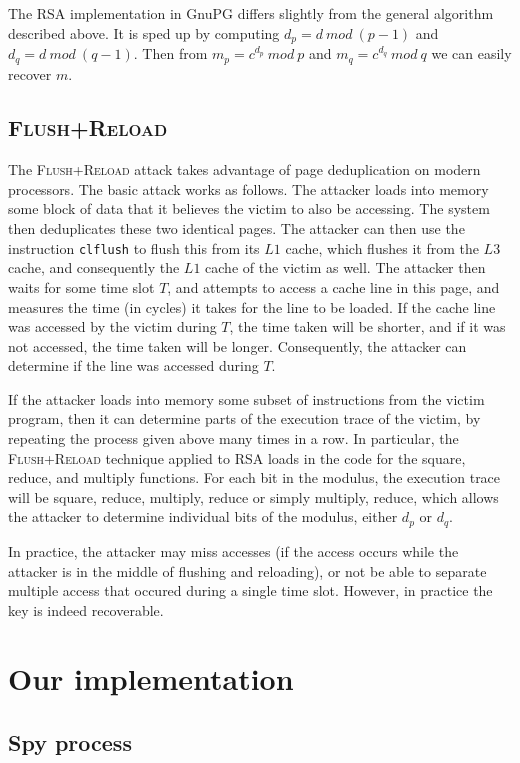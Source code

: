 \documentclass[11pt]{llncs}
\newcommand{\flushreload}{\textsc{Flush}+\textsc{Reload}}
\begin{document}
The RSA implementation in GnuPG differs slightly from the general algorithm
described above. It is sped up by computing $d_p = d\ mod\ (p-1)$ and $d_q = d\
mod\ (q-1)$. Then from $m_p = c^{d_p}\ mod\ p$ and $m_q = c^{d_q}\ mod\ q$ we
can easily recover $m$.

\subsection{\flushreload{}}

The \flushreload{} attack takes advantage of page deduplication on modern
processors. The basic attack works as follows. The attacker loads into memory
some block of data that it believes the victim to also be accessing. The system
then deduplicates these two identical pages. The attacker can then use the
instruction \texttt{clflush} to flush this from its $L1$ cache, which flushes it
from the $L3$ cache, and consequently the $L1$ cache of the victim as well. The
attacker then waits for some time slot $T$, and attempts to access a cache line
in this page, and measures the time (in cycles) it takes for the line to be
loaded. If the cache line was accessed by the victim during $T$, the time taken
will be shorter, and if it was not accessed, the time taken will be longer.
Consequently, the attacker can determine if the line was accessed during $T$.

If the attacker loads into memory some subset of instructions from the victim
program, then it can determine parts of the execution trace of the victim, by
repeating the process given above many times in a row. In particular, the
\flushreload{} technique applied to RSA loads in the code for the square,
reduce, and multiply functions. For each bit in the modulus, the execution trace
will be square, reduce, multiply, reduce or simply multiply, reduce, which
allows the attacker to determine individual bits of the modulus, either $d_p$ or
$d_q$.

In practice, the attacker may miss accesses (if the access occurs while the
attacker is in the middle of flushing and reloading), or not be able to separate
multiple access that occured during a single time slot. However, in practice the
key is indeed recoverable.

\section{Our implementation}

\subsection{Spy process}
\end{document}
